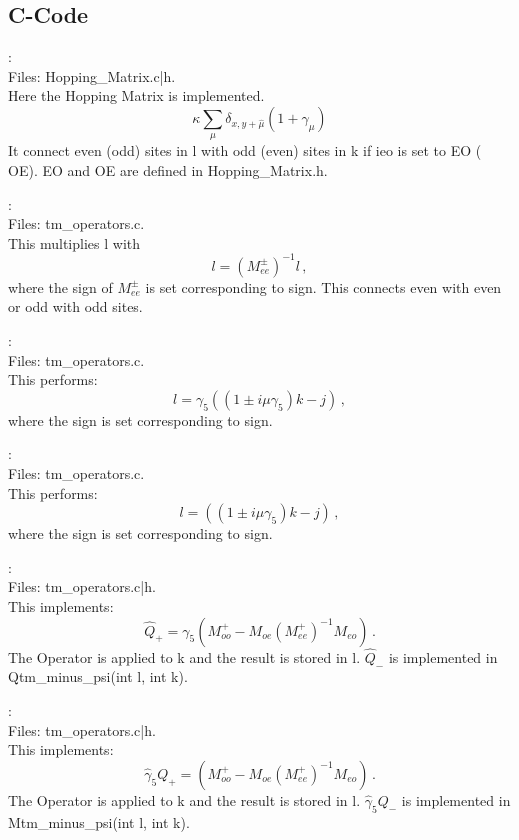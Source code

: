 \subsection{C-Code}

:\\
Files: {\ttfamily Hopping\_Matrix.c|h}.\\
Here the Hopping Matrix is implemented.
\[
\kappa\sum_\mu \delta_{x,y+\hat\mu}(1+\gamma_\mu)
\]
It connect even (odd) sites in {\ttfamily l} with odd  (even) sites in {\ttfamily k}
if {\ttfamily ieo} is set to {\ttfamily EO} ({\ttfamily
  OE}). {\ttfamily EO} and {\ttfamily OE} are defined in {\ttfamily
  Hopping\_Matrix.h}.

:\\
Files: {\ttfamily tm\_operators.c}.\\
This multiplies {\ttfamily l} with 
\[
l = (M_{ee}^{\pm})^{-1} l\, ,
\]
where the sign of $M_{ee}^{\pm}$ is set corresponding to {\ttfamily
  sign}. This connects even with even or odd with odd sites.

:\\
Files: {\ttfamily tm\_operators.c}.\\
This performs:
\[
l = \gamma_5 ((1 \pm i \mu \gamma_5)k - j)\, ,
\]
where the sign is set corresponding to {\ttfamily sign}.

:\\
Files: {\ttfamily tm\_operators.c}.\\
This performs:
\[
l = ((1 \pm i \mu \gamma_5)k - j)\, ,
\]
where the sign is set corresponding to {\ttfamily sign}.

:\\
Files: {\ttfamily tm\_operators.c|h}.\\
This implements:
\[
\hat Q_{+} = \gamma_5(M_{oo}^+ - M_{oe}(M_{ee}^+ )^{-1}M_{eo})\, .
\]
The Operator is applied to {\ttfamily k} and the result is stored in
{\ttfamily l}. $\hat Q_{-}$ is implemented in {\ttfamily
  Qtm\_minus\_psi(int l, int k)}.

:\\
Files: {\ttfamily tm\_operators.c|h}.\\
This implements:
\[
\hat \gamma_5Q_{+} = (M_{oo}^+ - M_{oe}(M_{ee}^+ )^{-1}M_{eo})\, .
\]
The Operator is applied to {\ttfamily k} and the result is stored in
{\ttfamily l}. $\hat \gamma_5Q_{-}$ is implemented in {\ttfamily
  Mtm\_minus\_psi(int l, int k)}.

